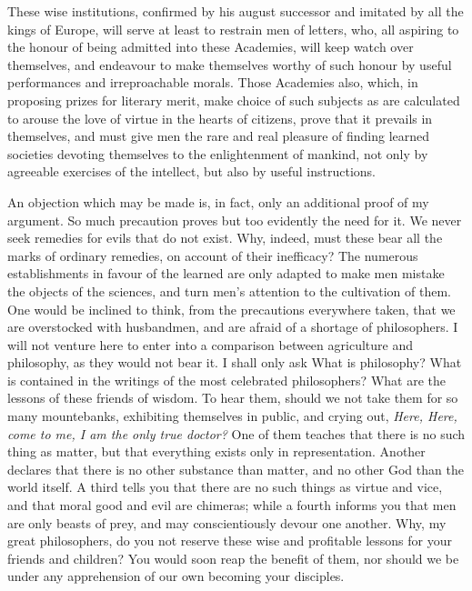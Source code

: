 These wise institutions, confirmed by his august successor and
imitated by all the kings of Europe, will serve at least to restrain
men of letters, who, all aspiring to the honour of being admitted into
these Academies, will keep watch over themselves, and endeavour to
make themselves worthy of such honour by useful performances and
irreproachable morals. Those Academies also, which, in proposing
prizes for literary merit, make choice of such subjects as are
calculated to arouse the love of virtue in the hearts of citizens,
prove that it prevails in themselves, and must give men the rare and
real pleasure of finding learned societies devoting themselves to the
enlightenment of mankind, not only by agreeable exercises of the
intellect, but also by useful instructions.

An objection which may be made is, in fact, only an additional proof
of my argument. So much precaution proves but too evidently the need
for it. We never seek remedies for evils that do not exist. Why,
indeed, must these bear all the marks of ordinary remedies, on account
of their inefficacy? The numerous establishments in favour of the
learned are only adapted to make men mistake the objects of the
sciences, and turn men's attention to the cultivation of them. One
would be inclined to think, from the precautions everywhere taken,
that we are overstocked with husbandmen, and are afraid of a shortage
of philosophers. I will not venture here to enter into a comparison
between agriculture and philosophy, as they would not bear it. I shall
only ask What is philosophy? What is contained in the writings of the
most celebrated philosophers? What are the lessons of these friends of
wisdom. To hear them, should we not take them for so many mountebanks,
exhibiting themselves in public, and crying out, \textit{Here, Here,
come to me, I am the only true doctor?} One of them teaches that there
is no such thing as matter, but that everything exists only in
representation. Another declares that there is no other substance than
matter, and no other God than the world itself. A third tells you that
there are no such things as virtue and vice, and that moral good and
evil  are chimeras; while a fourth informs you that men are
only beasts of prey, and may conscientiously devour one another. Why,
my great philosophers, do you not reserve these wise and profitable
lessons for your friends and children? You would soon reap the benefit
of them, nor should we be under any apprehension of our own becoming
your disciples.

